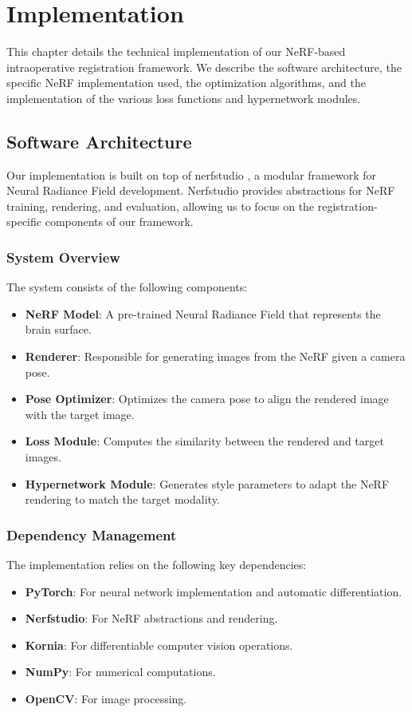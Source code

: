 \chapter{Implementation}

This chapter details the technical implementation of our NeRF-based intraoperative registration framework. We describe the software architecture, the specific NeRF implementation used, the optimization algorithms, and the implementation of the various loss functions and hypernetwork modules.

\section{Software Architecture}
Our implementation is built on top of nerfstudio \cite{tancik2023nerfstudio}, a modular framework for Neural Radiance Field development. Nerfstudio provides abstractions for NeRF training, rendering, and evaluation, allowing us to focus on the registration-specific components of our framework.

\subsection{System Overview}
The system consists of the following components:

\begin{itemize}
    \item \textbf{NeRF Model}: A pre-trained Neural Radiance Field that represents the brain surface.
    \item \textbf{Renderer}: Responsible for generating images from the NeRF given a camera pose.
    \item \textbf{Pose Optimizer}: Optimizes the camera pose to align the rendered image with the target image.
    \item \textbf{Loss Module}: Computes the similarity between the rendered and target images.
    \item \textbf{Hypernetwork Module}: Generates style parameters to adapt the NeRF rendering to match the target modality.
\end{itemize}

\subsection{Dependency Management}
The implementation relies on the following key dependencies:

\begin{itemize}
    \item \textbf{PyTorch}: For neural network implementation and automatic differentiation.
    \item \textbf{Nerfstudio}: For NeRF abstractions and rendering.
    \item \textbf{Kornia}: For differentiable computer vision operations.
    \item \textbf{NumPy}: For numerical computations.
    \item \textbf{OpenCV}: For image processing.
\end{itemize}

